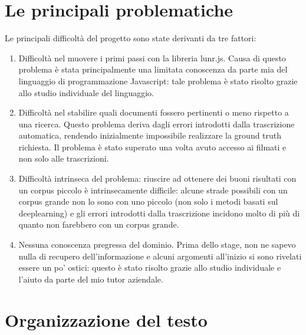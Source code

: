 \section{Le principali problematiche}
\label{sec:problematiche}
Le principali difficoltà del progetto sono state derivanti da tre fattori:
\begin{enumerate}
    \item Difficoltà nel muovere i primi passi con la libreria lunr.js. Causa di questo problema è stata principalmente una limitata conoscenza da parte mia del linguaggio di programmazione Javascript: tale problema è stato risolto grazie allo studio individuale del linguaggio.
    \item Difficoltà nel stabilire quali documenti fossero pertinenti o meno rispetto a una ricerca. Questo problema deriva dagli errori introdotti dalla trascrizione automatica, rendendo inizialmente impossibile realizzare la ground truth richiesta. Il problema è stato superato una volta avuto accesso ai filmati e non solo alle trascrizioni.
    \item Difficoltà intrinseca del problema: riuscire ad ottenere dei buoni risultati con un \gls{corpus} piccolo è intrinsecamente difficile: alcune strade possibili con un \gls{corpus} grande non lo sono con uno piccolo (non solo i metodi basati sul deeplearning) e gli errori introdotti dalla trascrizione incidono molto di più di quanto non farebbero con un \gls{corpus} grande. 
    \item Nessuna conoscenza pregressa del dominio. Prima dello stage, non ne sapevo nulla di recupero dell'informazione e alcuni argomenti all'inizio si sono rivelati essere un po' ostici: questo è stato risolto grazie allo studio individuale e l'aiuto da parte del mio tutor aziendale. 
\end{enumerate}

\section{Organizzazione del testo}

